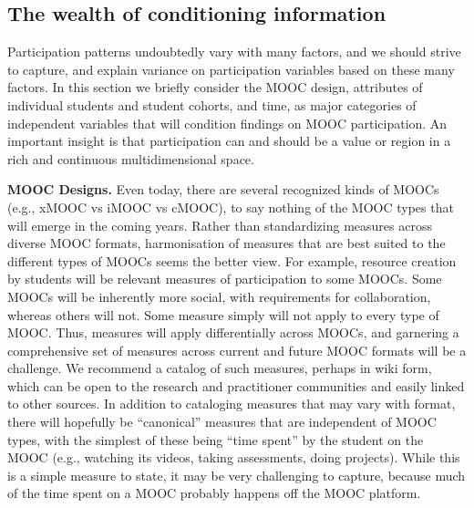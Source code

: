 \subsection{The wealth of conditioning information}

Participation patterns
undoubtedly vary with many factors, and we should strive to capture, and
explain variance on participation variables based on these many
factors. In this section we briefly consider the MOOC design, attributes
of individual students and student cohorts, and time, as major
categories of independent variables that will condition findings on MOOC
participation. An important insight is that participation can and should
be a value or region in a rich and continuous multidimensional space.

\textbf{MOOC Designs.} Even today, there are several recognized kinds of MOOCs
(e.g., xMOOC vs iMOOC vs cMOOC), to say nothing of the MOOC types that
will emerge in the coming years.  Rather than standardizing measures
across diverse MOOC formats, harmonisation of measures that are best
suited to the different types of MOOCs seems the better view. For
example, resource creation by students will be relevant measures of
participation to some MOOCs. Some MOOCs will be inherently more social,
with requirements for collaboration, whereas others will not. Some
measure simply will not apply to every type of MOOC. Thus, measures will
apply differentially across MOOCs, and garnering a comprehensive set of
measures across current and future MOOC formats will be a challenge. We
recommend a catalog of such measures, perhaps in wiki form, which can be
open to the research and practitioner communities and easily linked to
other sources.  In addition to cataloging measures that may vary with
format, there will hopefully be ``canonical'' measures that are
independent of MOOC types, with the simplest of these being ``time spent''
by the student on the MOOC (e.g., watching its videos, taking
assessments, doing projects). While this is a simple measure to state,
it may be very challenging to capture, because much of the time spent on
a MOOC probably happens off the MOOC platform.  

